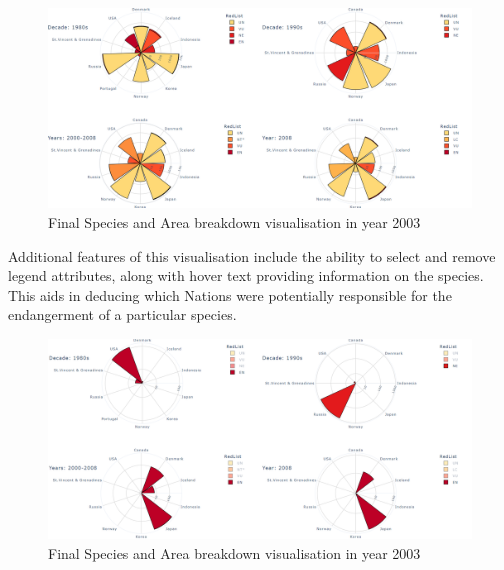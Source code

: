 \documentclass[12pt,a4paper]{article}
\begin{document}
\begin{figure}[H]
    \centering
    \includegraphics[width = 18cm]{polarGraph.png}
    \caption{Final Species and Area breakdown visualisation in year 2003}
    \label{fig:my_label}
\end{figure}

Additional features of this visualisation include the ability to select and remove legend attributes, along with hover text providing information on the species. This aids in deducing which Nations were potentially responsible for the endangerment of a particular species. 

\begin{figure}[H]
    \centering
    \includegraphics[width = 18cm]{PolarPlot.png}
    \caption{Final Species and Area breakdown visualisation in year 2003}
    \label{fig:my_label}
\end{figure}
\end{document}
